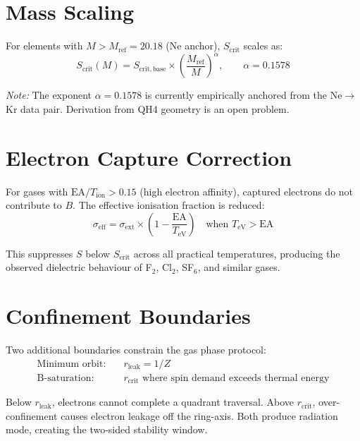 \documentclass[12pt,a4paper]{article}
\theoremstyle{definition}
\begin{document}
\section{Mass Scaling}

For elements with $M > M_{\mathrm{ref}} = 20.18$ (Ne anchor), $S_{\mathrm{crit}}$ scales as:
\begin{equation}
  S_{\mathrm{crit}}(M) = S_{\mathrm{crit,base}} \times \left(\frac{M_{\mathrm{ref}}}{M}\right)^{\alpha}, \qquad \alpha = 0.1578
\end{equation}

\textit{Note:} The exponent $\alpha = 0.1578$ is currently empirically anchored from the Ne$\to$Kr data pair. Derivation from QH4 geometry is an open problem.

\section{Electron Capture Correction}

For gases with $\mathrm{EA}/T_{\mathrm{ion}} > 0.15$ (high electron affinity), captured electrons do not contribute to $B$. The effective ionisation fraction is reduced:
\begin{equation}
  \sigma_{\mathrm{eff}} = \sigma_{\mathrm{ext}} \times \left(1 - \frac{\mathrm{EA}}{T_{\mathrm{eV}}}\right) \quad \text{when } T_{\mathrm{eV}} > \mathrm{EA}
\end{equation}

This suppresses $S$ below $S_{\mathrm{crit}}$ across all practical temperatures, producing the observed dielectric behaviour of F$_{2}$, Cl$_{2}$, SF$_{6}$, and similar gases.

\section{Confinement Boundaries}

Two additional boundaries constrain the gas phase protocol:
\begin{align*}
  \text{Minimum orbit:}   &\quad r_{\mathrm{leak}} = 1/Z\\
  \text{B-saturation:}    &\quad r_{\mathrm{crit}} \text{ where spin demand exceeds thermal energy}
\end{align*}

Below $r_{\mathrm{leak}}$, electrons cannot complete a quadrant traversal. Above $r_{\mathrm{crit}}$, over-confinement causes electron leakage off the ring-axis. Both produce radiation mode, creating the two-sided stability window.
\end{document}
